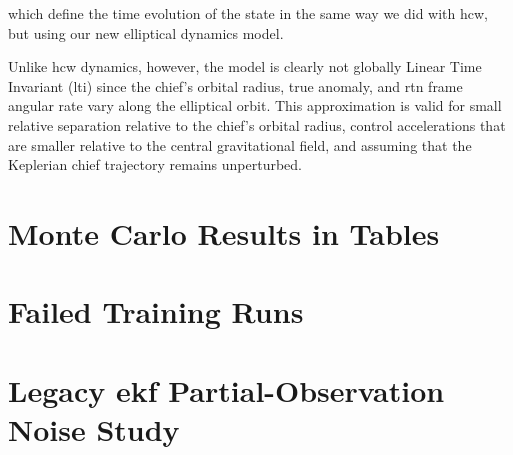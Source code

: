 which define the time evolution of the state in the same way we did with \acs{hcw}, but using our new elliptical dynamics model.

Unlike \acs{hcw} dynamics, however, the model is clearly not globally Linear Time Invariant (\acs{lti}) since the chief's orbital radius, true anomaly, and \acs{rtn} frame angular rate vary along the elliptical orbit. This approximation is valid for small relative separation relative to the chief's orbital radius, control accelerations that are smaller relative to the central gravitational field, and assuming that the Keplerian chief trajectory remains unperturbed.



\chapter{Monte Carlo Results in Tables}
\label{appendix:MC_Tables}






\chapter{Failed Training Runs}
\label{appendix:failed-training-runs}



\chapter{Legacy \acs{ekf} Partial-Observation Noise Study}
\label{appendix:legacy-ekf-bc-noise-study}



